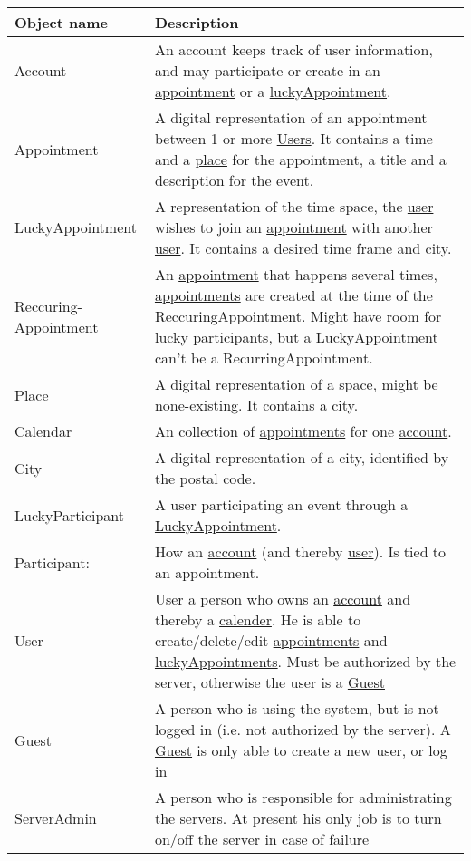 {\tabulinesep=1.2mm
\begin{tabu}{ | p{3cm} | p{13cm} |}\hline
    Object name 			& 		Description\\\hline
    Account 				& 		An account keeps track of user information, and may participate or create in an \uline{appointment} or a \uline{luckyAppointment}. \\\hline
	Appointment				&		A digital representation of an appointment between 1 or more \uline{Users}. It contains a time and a \uline{place} for the appointment, a title and a description for the event.\\\hline
	LuckyAppointment		&		A representation of the time space, the \uline{user} wishes to join an \uline{appointment} with another \uline{user}. It contains a desired time frame and city.\\\hline
	Reccuring-Appointment	&		An \uline{appointment} that happens several times, \uline{appointments} are created at the time of the ReccuringAppointment. Might have room for lucky participants, but a LuckyAppointment can't be a RecurringAppointment. \\ \hline
    Place 					& 		A digital representation of a space, might be none-existing. It contains a city.\\\hline
	Calendar				&		An collection of \uline{appointments} for one \uline{account}.\\ \hline
    City 					& 		A digital representation of a city, identified by the postal code.\\\hline
	LuckyParticipant		&		A user participating an event through a \uline{LuckyAppointment}.\\\hline
	Participant: 			&		How an \uline{account} (and thereby \uline{user}). Is tied to an appointment.\\\hline
    User  					& 		User a person who owns an \uline{account} and thereby a \uline{calender}. He is able to create/delete/edit \uline{appointments} and  \uline{luckyAppointments}. Must be authorized by the server, otherwise the user is a \uline{Guest} \\\hline
    Guest					&		A person who is using the system, but is not logged in (i.e. not authorized by the server). A \uline{Guest} is only able to create a new user, or log in \\\hline
    ServerAdmin				&		A person who is responsible for administrating the servers. At present his only job is to turn on/off the server in case of failure \\\hline
\end{tabu}
}